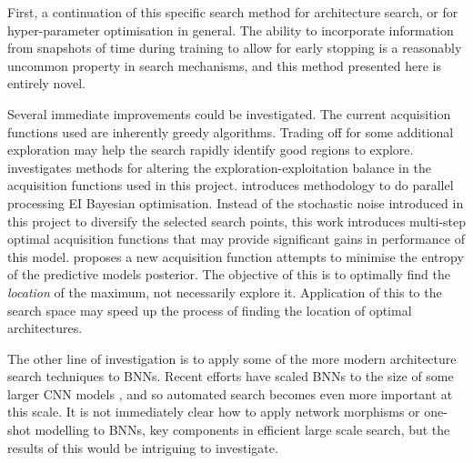 First, a continuation of this specific search method for architecture search, or for hyper-parameter optimisation in general. The ability to incorporate information from snapshots of time during training to allow for early stopping is a reasonably uncommon property in search mechanisms, and this method presented here is entirely novel.

Several immediate improvements could be investigated. The current acquisition functions used are inherently greedy algorithms. Trading off for some additional exploration may help the search rapidly identify good regions to explore. \citet{Brochu2010a} investigates methods for altering the exploration-exploitation balance in the acquisition functions used in this project. \citet{Ginsbourger2008} introduces methodology to do parallel processing EI Bayesian optimisation. Instead of the stochastic noise introduced in this project to diversify the selected search points, this work introduces multi-step optimal acquisition functions that may provide significant gains in performance of this model. \citet{Hennig2012} proposes a new acquisition function attempts to minimise the entropy of the predictive models posterior. The objective of this is to optimally find the \textit{location} of the maximum, not necessarily explore it. Application of this to the search space may speed up the process of finding the location of optimal architectures.

The other line of investigation is to apply some of the more modern architecture search techniques to BNNs. Recent efforts have scaled BNNs to the size of some larger CNN models \cite{Shridhar2018,richtalkBNNscale}, and so automated search becomes even more important at this scale. It is not immediately clear how to apply network morphisms or one-shot modelling to BNNs, key components in efficient large scale search, but the results of this would be intriguing to investigate.